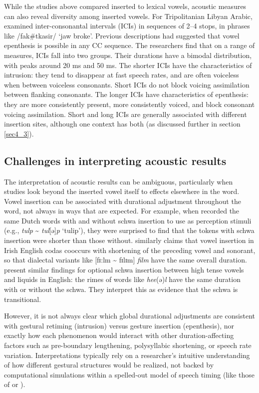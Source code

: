 \documentclass[output=paper,colorlinks,citecolor=brown]{langscibook}
\begin{document}
While the studies above compared inserted to lexical vowels, acoustic measures can also reveal diversity among inserted vowels. For Tripolitanian Libyan Arabic, \citet{heselwood2015epenthetic} examined inter-consonantal intervals (ICIs) in sequences of 2--4 stops, in phrases like /fak\#tkasir/ ‘jaw broke’. Previous descriptions had suggested that vowel epenthesis is possible in any CC sequence. The researchers find that on a range of measures, ICIs fall into two groups. Their durations have a bimodal distribution, with peaks around 20 ms and 50 ms. The shorter ICIs have the characteristics of intrusion: they tend to disappear at fast speech rates, and are often voiceless when between voiceless consonants. Short ICIs do not block voicing assimilation between flanking consonants. The longer ICIs have characteristics of epenthesis: they are more consistently present, more consistently voiced, and block consonant voicing assimilation. Short and long ICIs are generally associated with different insertion sites, although one context has both (as discussed further in section \ref{sec4_3}). 

\subsection{Challenges in interpreting acoustic results}
The interpretation of acoustic results can be ambiguous, particularly when studies look beyond the inserted vowel itself to effects elsewhere in the word. Vowel insertion can be associated with durational adjustment throughout the word, not always in ways that are expected. For example, when \citet[65]{van1999facilitatory} recorded the same Dutch words with and without schwa insertion to use as perception stimuli (e.g., \textit{tulp} {\textasciitilde} \textit{tul}[ə]\textit{p} ‘tulip’), they were surprised to find that the tokens with schwa insertion were shorter than those without. \citet{Hickey1985} similarly claims that vowel insertion in Irish English codas cooccurs with shortening of the preceding vowel and sonorant, so that dialectal variants like [fɪ:lm {\textasciitilde} fɪlɪm] \textit{film} have the same overall duration. \citet{gick2006excrescent} present similar findings for optional schwa insertion between high tense vowels and liquids in English: the rimes of words like \textit{hee}(ə)\textit{l} have the same duration with or without the schwa. They interpret this as evidence that the schwa is transitional. 

However, it is not always clear which global durational adjustments are consistent with gestural retiming (intrusion) versus gesture insertion (epenthesis), nor exactly how each phenomenon would interact with other duration-affecting factors such as pre-boundary lengthening, polysyllabic shortening, or speech rate variation. Interpretations typically rely on a researcher’s intuitive understanding of how different gestural structures would be realized, not backed by computational simulations within a spelled-out model of speech timing (like those of \citealt{Gafos2002} or \citealt{browman1992targetless}). 
\end{document}
